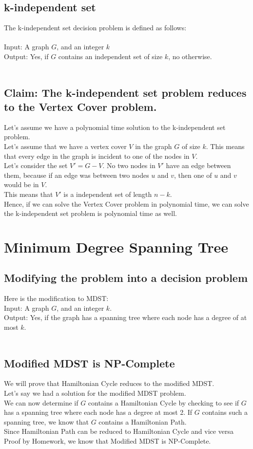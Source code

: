 \documentclass[12pt,twocolumn]{article}
\begin{document}
\subsection{k-independent set}
The k-independent set decision problem is defined as follows:\\
\\
Input: A graph $G$, and an integer $k$\\
Output: Yes, if $G$ contains an independent set of size $k$, no otherwise.\\
\\
\subsection{Claim: The k-independent set problem reduces to the Vertex Cover problem.}
Let's assume we have a polynomial time solution to the k-independent set problem.\\
Let's assume that we have a vertex cover $V$ in the graph $G$ of size $k$. This means that every edge in the graph is incident to one of the nodes in $V$. \\
Let's consider the set $V' = G - V$. No two nodes in $V'$ have an edge between them, because if an edge was between two nodes $u$ and $v$, then one of $u$ and $v$ would be in $V$.\\
This means that $V'$ is a independent set of length $n-k$.\\
Hence, if we can solve the Vertex Cover problem in polynomial time, we can solve the k-independent set problem is polynomial time as well.

\section{ Minimum Degree Spanning Tree }
\subsection{Modifying the problem into a decision problem}
Here is the modification to MDST:\\
Input: A graph $G$, and an integer $k$.\\
Output: Yes, if the graph has a spanning tree where each node has a degree of at most $k$.\\
\\
\subsection{Modified MDST is NP-Complete}
We will prove that Hamiltonian Cycle reduces to the modified MDST.\\
Let's say we had a solution for the modified MDST problem.\\
We can now determine if $G$ contains a Hamiltonian Cycle by checking to see if $G$ has a spanning tree where each node has a degree at most 2. If $G$ contains such a spanning tree, we know that $G$ contains a Hamiltonian Path.\\
Since Hamiltonian Path can be reduced to Hamiltonian Cycle and vice versa {Proof by Homework}, we know that Modified MDST is NP-Complete.
\end{document}
